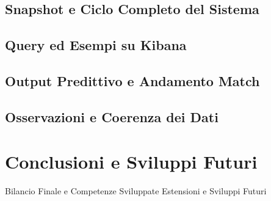 \documentclass[a4paper,12pt]{report}
\begin{document}
\section{Snapshot e Ciclo Completo del Sistema}

\section{Query ed Esempi su Kibana}

\section{Output Predittivo e Andamento Match}

\section{Osservazioni e Coerenza dei Dati}



\chapter*{Conclusioni e Sviluppi Futuri}

Bilancio Finale e Competenze Sviluppate
Estensioni e Sviluppi Futuri
\end{document}
